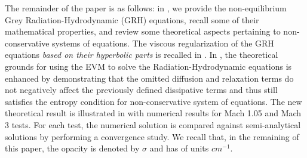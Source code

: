 \documentclass[times,doublespace]{fldauth}%
\begin{document}
The remainder of the paper is as follows: in , we provide
the non-equilibrium Grey Radiation-Hydrodynamic (GRH) equations, recall some of their mathematical properties, 
and review some theoretical aspects pertaining to non-conservative systems of equations. 
The viscous regularization of the GRH equations {\it based on their hyperbolic parts} is recalled in .
In , the theoretical grounds for using the EVM to solve the 
Radiation-Hydrodynamic equations is enhanced by demonstrating that the omitted diffusion
and relaxation terms do not negatively affect the previously defined dissipative terms and thus still satisfies the 
entropy condition for non-conservative system of equations. 
The new theoretical result is illustrated in  with numerical results for Mach 1.05 and Mach 3 tests. For each test, the numerical solution is compared against semi-analytical solutions by performing a convergence study. We recall that, in the remaining of this paper, the opacity is denoted by $\sigma$ and has of units $cm^{-1}$. 
%
\end{document}
